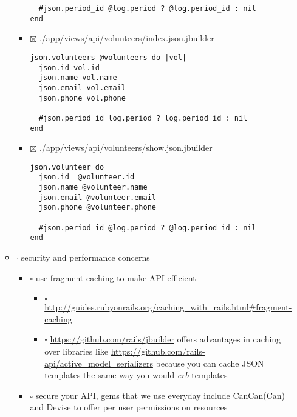\documentclass[11pt]{article}
\begin{document}
\begin{itemize}
\begin{itemize}
\begin{itemize}
\begin{verbatim}
  #json.period_id @log.period ? @log.period_id : nil
end
\end{verbatim}

\item $\boxtimes$ \url{./app/views/api/volunteers/index.json.jbuilder}

\begin{verbatim}
json.volunteers @volunteers do |vol|
  json.id vol.id
  json.name vol.name
  json.email vol.email
  json.phone vol.phone

  #json.period_id log.period ? log.period_id : nil
end
\end{verbatim}

\item $\boxtimes$ \url{./app/views/api/volunteers/show.json.jbuilder}

\begin{verbatim}
json.volunteer do
  json.id  @volunteer.id
  json.name @volunteer.name
  json.email @volunteer.email
  json.phone @volunteer.phone

  #json.period_id @log.period ? @log.period_id : nil
end
\end{verbatim}
\end{itemize}

\item $\square$ security and performance concerns

\begin{itemize}
\item $\square$ use fragment caching to make API efficient

\begin{itemize}
\item $\square$ \url{http://guides.rubyonrails.org/caching_with_rails.html#fragment-caching}

\item $\square$ \url{https://github.com/rails/jbuilder}
          offers advantages in caching over libraries like \url{https://github.com/rails-api/active_model_serializers}
          because you can cache JSON templates the same way you would \emph{erb} templates
\end{itemize}

\item $\square$ secure your API, gems that we use everyday include CanCan(Can) 
and Devise to offer per user permissions on resources


\end{itemize}
\end{itemize}
\end{itemize}
\end{document}
